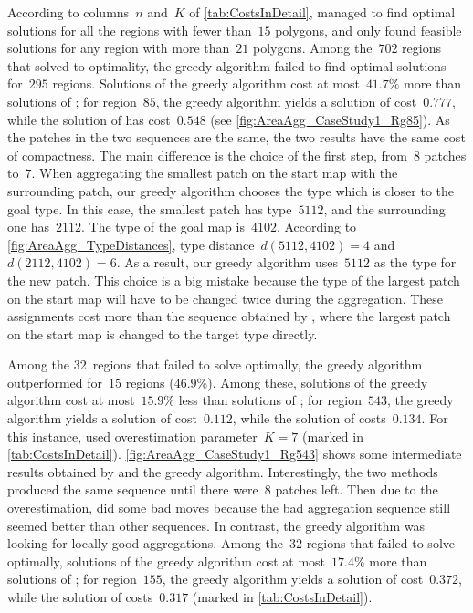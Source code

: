 \documentclass[acmsmall,natbib=false]{acmart}
\begin{document}
According to columns~$n$ and~$K$ of \tab\ref{tab:CostsInDetail},
\Astar managed to find optimal solutions 
for all the regions with fewer than~$15$ polygons,
and only found feasible solutions 
for any region with more than~$21$ polygons.
Among the~$702$ regions that \Astar solved to optimality,
the greedy algorithm failed to 
find optimal solutions for~$295$ regions.
Solutions of the greedy algorithm cost
at most~$41.7\%$ more than solutions of \Astar;
for region~$85$, the greedy algorithm yields 
a solution of cost~$0.777$, 
while the solution of \Astar has cost~$0.548$
(see \fig\ref{fig:AreaAgg_CaseStudy1_Rg85}).
As the patches in the two sequences are the same,
the two results have the same cost of compactness.
The main difference is the choice of the first step, 
from~$8$ patches to~$7$.
When aggregating the smallest patch on the start map
with the surrounding patch,
our greedy algorithm chooses the type 
which is closer to the goal type.
In this case, the smallest patch has type~$5112$, and the 
surrounding one has~$2112$.
The type of the goal map is~$4102$.
According to \fig\ref{fig:AreaAgg_TypeDistances},
type distance~$d(5112,4102)=4$ and~$d(2112,4102)=6$.
As a result, our greedy algorithm uses~$5112$ 
as the type for the new patch. 
This choice is a big mistake 
because the type of the largest patch on the start map
will have to be changed twice during the aggregation.
These assignments cost more than the sequence obtained by 
\Astar, where the largest patch on the start map is changed to 
the target type directly.

Among the $32$~regions that 
\Astar failed to solve optimally,
the greedy algorithm outperformed \Astar 
for~$15$ regions ($46.9\%$).
%
Among these, solutions of the greedy algorithm 
cost at most~$15.9\%$ less than solutions of \Astar;
for region~$543$, the greedy algorithm yields 
a solution of cost~$0.112$, 
while the solution of \Astar costs~$0.134$. 
For this instance, \Astar used overestimation parameter~$K=7$
(marked in \tab\ref{tab:CostsInDetail}).
\fig\ref{fig:AreaAgg_CaseStudy1_Rg543} shows 
some intermediate results obtained by
\Astar and the greedy algorithm.
Interestingly, the two methods produced the same sequence until 
there were~$8$ patches left.
Then due to the overestimation, \Astar did some bad moves
because the bad aggregation sequence still seemed better 
than other sequences.
In contrast, the greedy algorithm was looking for locally good 
aggregations.
%
Among the~$32$ regions that \Astar failed to solve optimally,  solutions of the greedy algorithm cost at most~$17.4\%$ 
more than solutions of \Astar; 
for region~$155$, the greedy algorithm yields 
a solution of cost~$0.372$, while
the solution of \Astar costs~$0.317$
(marked in \tab\ref{tab:CostsInDetail}).
\end{document}
